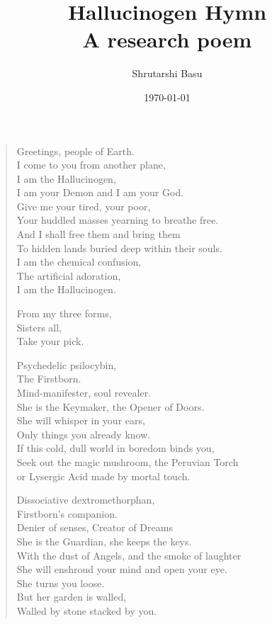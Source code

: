 \documentclass[11pt,letterpaper]{article}
\title{Hallucinogen Hymn\\ A research poem}
\author{Shrutarshi Basu}
\date{\today}
\begin{document}
\maketitle
\begin{verse}
Greetings, people of Earth.\\
I come to you from another plane,\\
I am the Hallucinogen,\\
I am your Demon and I am your God.\\
Give me your tired, your poor,\\
Your huddled masses yearning to breathe free.\\
And I shall free them and bring them\\
To hidden lands buried deep within their souls.\\
I am the chemical confusion,\\
The artificial adoration,\\
I am the Hallucinogen.

From my three forms,\\
Sisters all,\\
Take your pick.

Psychedelic psilocybin,\\
The Firstborn.\\
Mind-manifester, soul revealer.\\
She is the Keymaker, the Opener of Doors.\\
She will whisper in your ears,\\
Only things you already know.\\
If this cold, dull world in boredom binds you,\\
Seek out the magic mushroom, the Peruvian Torch\\
or Lysergic Acid made by mortal touch.

Dissociative dextromethorphan,\\
Firstborn's companion.\\
Denier of senses, Creator of Dreams\\
She is the Guardian, she keeps the keys.\\
With the dust of Angels, and the smoke of laughter\\
She will enshroud your mind and open your eye.\\
She turns you loose.\\
But her garden is walled,\\
Walled by stone stacked by you.


\end{verse}
\end{document}
